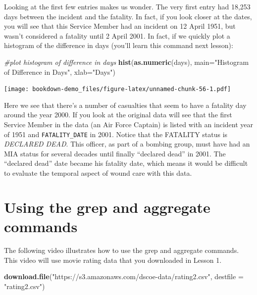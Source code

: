 \documentclass[]{book}
\newenvironment{Shaded}{\begin{snugshade}}{\end{snugshade}}
\newcommand{\KeywordTok}[1]{\textcolor[rgb]{0.13,0.29,0.53}{\textbf{{#1}}}}
\newcommand{\DataTypeTok}[1]{\textcolor[rgb]{0.13,0.29,0.53}{{#1}}}
\newcommand{\StringTok}[1]{\textcolor[rgb]{0.31,0.60,0.02}{{#1}}}
\newcommand{\CommentTok}[1]{\textcolor[rgb]{0.56,0.35,0.01}{\textit{{#1}}}}
\newcommand{\NormalTok}[1]{{#1}}
\begin{document}
Looking at the first few entries makes us wonder. The very first entry
had 18,253 days between the incident and the fatality. In fact, if you
look closer at the dates, you will see that this Service Member had an
incident on 12 April 1951, but wasn't considered a fatality until 2
April 2001. In fact, if we quickly plot a histogram of the difference in
days (you'll learn this command next lesson):

\begin{Shaded}
\begin{Highlighting}[]
\CommentTok{#plot histogram of difference in days}
\KeywordTok{hist}\NormalTok{(}\KeywordTok{as.numeric}\NormalTok{(days), }\DataTypeTok{main=}\StringTok{"Histogram of Difference in Days"}\NormalTok{, }\DataTypeTok{xlab=}\StringTok{"Days"}\NormalTok{)  }
\end{Highlighting}
\end{Shaded}

\texttt{[image: bookdown-demo\_files/figure-latex/unnamed-chunk-56-1.pdf]}

Here we see that there's a number of casualties that seem to have a
fatality day around the year 2000. If you look at the original data will
see that the first Service Member in the data (an Air Force Captain) is
listed with an incident year of 1951 and \texttt{FATALITY\_DATE} in
2001. Notice that the FATALITY status is \emph{DECLARED DEAD}. This
officer, as part of a bombing group, must have had an MIA status for
several decades until finally ``declared dead'' in 2001. The ``declared
dead'' date became his fatality date, which means it would be difficult
to evaluate the temporal aspect of wound care with this data.

\section{Using the grep and aggregate
commands}\label{using-the-grep-and-aggregate-commands}

The following video illustrates how to use the grep and aggregate
commands. This video will use movie rating data that you downloaded in
Lesson 1.

\begin{Shaded}
\begin{Highlighting}[]
\KeywordTok{download.file}\NormalTok{(}\StringTok{"https://s3.amazonaws.com/dscoe-data/rating2.csv"}\NormalTok{, }\DataTypeTok{destfile =} \StringTok{"rating2.csv"}\NormalTok{)}
\end{Highlighting}
\end{Shaded}
\end{document}
